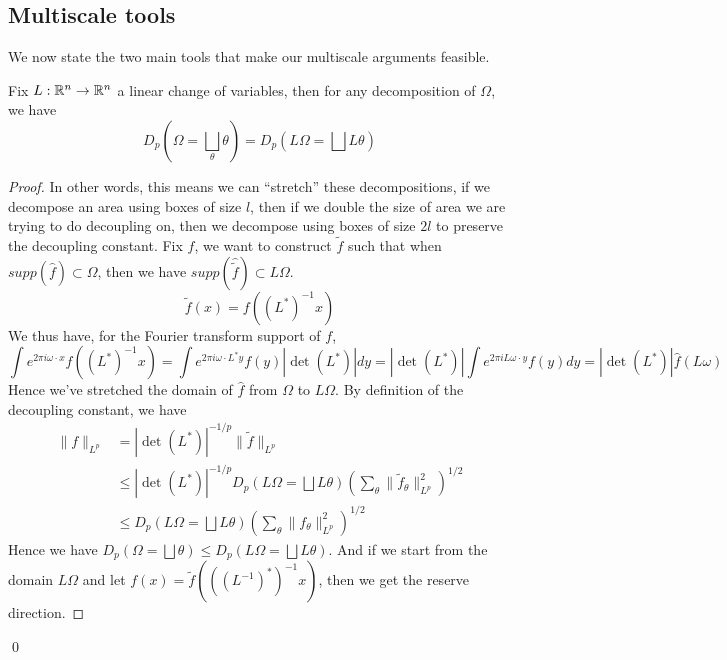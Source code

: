 \subsection*{Multiscale tools}
We now state the two main tools that make our multiscale arguments feasible.
\begin{lemma}
    Fix $L:\mathbb{R}^n\to\mathbb{R}^n$ a linear change of variables, then for any decomposition of $\Omega$, we have
    \begin{equation*}
        D_p(\Omega=\bigsqcup_\theta\theta)=D_p(L\Omega=\bigsqcup L\theta)
    \end{equation*}
\end{lemma}
\begin{proof}
    In other words, this means we can ``stretch'' these decompositions, if we decompose an area using boxes of size $l$, then if we double the size of area we are trying to do decoupling on, then we decompose using boxes of size $2l$ to preserve the decoupling constant. Fix $f$, we want to construct $\tilde{f}$ such that when $supp(\widehat{f})\subset\Omega$, then we have $supp(\widehat{\tilde{f}})\subset L \Omega$.
    \begin{equation*}
        \tilde{f}(x)=f((L^*)^{-1}x)
    \end{equation*}
    We thus have, for the Fourier transform support of $f$,
    \begin{equation*}
        \int e^{2\pi i\omega\cdot x}f((L^*)^{-1}x)=\int e^{2\pi i\omega\cdot L^*y}f(y)|\det(L^*)|dy=|\det(L^*)|\int e^{2\pi iL\omega\cdot y}f(y)dy=|\det(L^*)|\widehat{f}(L\omega)
    \end{equation*}
    Hence we've stretched the domain of $\widehat{f}$ from $\Omega$ to $L\Omega$.
    By definition of the decoupling constant,
    we have
    \begin{align*}
        \|f\|_{L^p}&=|\det(L^*)|^{-1/p}\|\tilde{f}\|_{L^p}\\
        &\leq |\det(L^*)|^{-1/p}D_p(L\Omega=\bigsqcup L\theta)\left(\sum_\theta\|\tilde{f}_\theta\|_{L^p}^2 \right)^{1/2}\\
        &\leq D_p(L\Omega=\bigsqcup L\theta)\left(\sum_\theta\|f_\theta\|_{L^p}^2 \right)^{1/2}
    \end{align*}
    Hence we have $D_p(\Omega=\bigsqcup\theta)\leq D_p(L\Omega=\bigsqcup L\theta)$. And if we start from the domain $L\Omega$ and let $f(x)=\tilde{f}(((L^{-1})^*)^{-1}x)$, then we get the reserve direction.
\end{proof}
\qed

